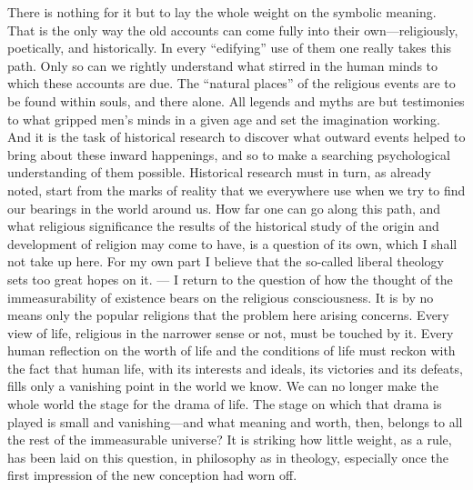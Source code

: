 \documentclass[12pt,a4paper]{article}
\newcommand{\opage}[1]{\marginnote{\footnotesize\textit{[#1]}}}
\begin{document}
There is nothing for it but to lay the whole weight on the symbolic meaning. That
is the only way the old accounts can come fully into their own---religiously,
poetically, and historically. In every ``edifying'' use of them one really takes
this path. Only so can we rightly understand what stirred in the human minds to
which these accounts are due. The ``natural places'' of the religious events are
to be found within souls, and there alone. All legends and myths are but
testimonies to what gripped men's minds in a given age and set the imagination
working. And it is the task of historical research to discover what outward events
helped to bring about these inward happenings, and so to make a searching
psychological understanding of them possible. Historical research must in turn, as
already noted, start from the marks of reality that we everywhere use when we try
to find our bearings in the world around us. How far one can go along this path,
and what religious significance the results of the historical study of the origin
and development of religion may come to have, is a question of its own, which I
shall not take up here. For my own part I believe that the so-called liberal
theology sets too great hopes on it. --- I return to the question of how the
thought of the \opage{11}immeasurability of existence bears on the religious consciousness.
It is by no means only the popular religions that the problem here arising
concerns. Every view of life, religious in the narrower sense or not, must be
touched by it. Every human reflection on the worth of life and the conditions of
life must reckon with the fact that human life, with its interests and ideals, its
victories and its defeats, fills only a vanishing point in the world we know. We
can no longer make the whole world the stage for the drama of life. The stage on
which that drama is played is small and vanishing---and what meaning and worth,
then, belongs to all the rest of the immeasurable universe? It is striking how
little weight, as a rule, has been laid on this question, in philosophy as in
theology, especially once the first impression of the new conception had worn off.
\end{document}

